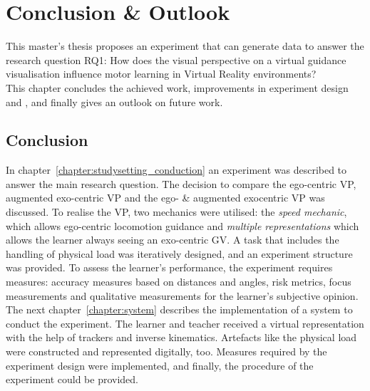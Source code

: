 \chapter{Conclusion \& Outlook}
\label{chapter:conclusion}

This master's thesis proposes an experiment that can generate data to answer the research question RQ1: How does the visual perspective on a virtual guidance visualisation influence motor learning in Virtual Reality environments?\\
This chapter concludes the achieved work, improvements in experiment design and \exgo, and finally gives an outlook on future work. 

\section{Conclusion}
In chapter~\ref{chapter:studysetting_conduction} an experiment was described to answer the main research question. The decision to compare the ego-centric VP, augmented exo-centric VP and the ego- \& augmented exocentric VP was discussed. To realise the VP, two mechanics were utilised: the \textit{speed mechanic}, which allows ego-centric locomotion guidance and \textit{multiple representations} which allows the learner always seeing an exo-centric GV. A task that includes the handling of physical load was iteratively designed, and an experiment structure was provided. To assess the learner's performance, the experiment requires measures: accuracy measures based on distances and angles, risk metrics, focus measurements and qualitative measurements for the learner's subjective opinion. The next chapter~\ref{chapter:system} describes the implementation of a system to conduct the experiment. The learner and teacher received a virtual representation with the help of trackers and inverse kinematics. Artefacts like the physical load were constructed and represented digitally, too. Measures required by the experiment design were implemented, and finally, the procedure of the experiment could be provided.\\

